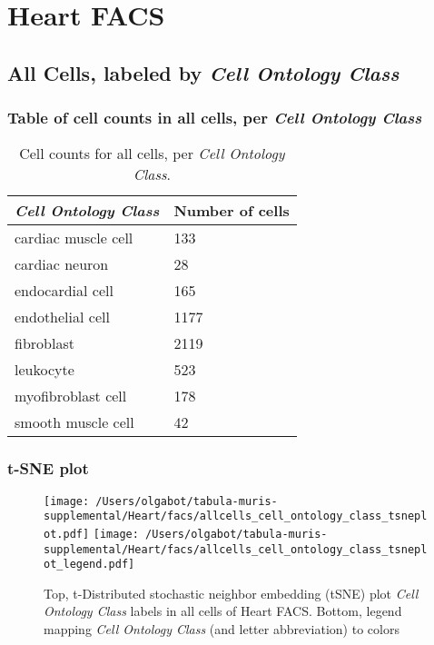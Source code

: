 \clearpage
\section{Heart FACS}

\subsection{All Cells, labeled by \emph{Cell Ontology Class}}
\subsubsection{Table of cell counts in all cells, per \emph{Cell Ontology Class}}\begin{table}[h]
\centering
\label{my-label}
\begin{tabular}{@{}ll@{}}
\toprule

\emph{Cell Ontology Class}& Number of cells \\ \midrule
cardiac muscle cell & 133 \\

cardiac neuron & 28 \\

endocardial cell & 165 \\

endothelial cell & 1177 \\

fibroblast & 2119 \\

leukocyte & 523 \\

myofibroblast cell & 178 \\

smooth muscle cell & 42 \\
\bottomrule
\end{tabular}
\caption{Cell counts for all cells, per \emph{Cell Ontology Class}.}
\end{table}

\clearpage
\subsubsection{t-SNE plot}
\begin{figure}[h]
\centering
\texttt{[image: /Users/olgabot/tabula-muris-supplemental/Heart/facs/allcells\_cell\_ontology\_class\_tsneplot.pdf]}
\texttt{[image: /Users/olgabot/tabula-muris-supplemental/Heart/facs/allcells\_cell\_ontology\_class\_tsneplot\_legend.pdf]}
\caption{Top, t-Distributed stochastic neighbor embedding (tSNE) plot  \emph{Cell Ontology Class} labels in all cells of Heart FACS. Bottom, legend mapping \emph{Cell Ontology Class} (and letter abbreviation) to colors}
\end{figure}


